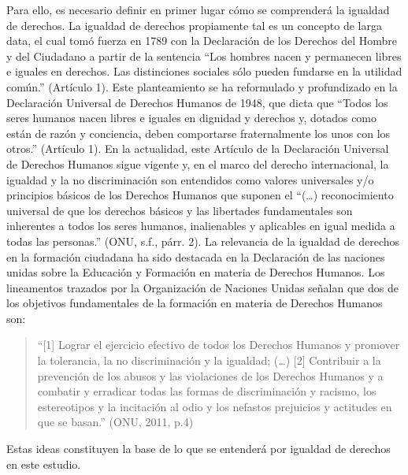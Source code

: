 \documentclass[12pt,twoside]{templates/facsothesis}
\begin{document}
Para ello, es necesario definir en primer lugar cómo se comprenderá la igualdad de derechos. La igualdad de derechos propiamente tal es un concepto de larga data, el cual tomó fuerza en 1789 con la Declaración de los Derechos del Hombre y del Ciudadano a partir de la sentencia ``Los hombres nacen y permanecen libres e iguales en derechos. Las distinciones sociales sólo pueden fundarse en la utilidad común.'' (Artículo 1). Este planteamiento se ha reformulado y profundizado en la Declaración Universal de Derechos Humanos de 1948, que dicta que ``Todos los seres humanos nacen libres e iguales en dignidad y derechos y, dotados como están de razón y conciencia, deben comportarse fraternalmente los unos con los otros.'' (Artículo 1). En la actualidad, este Artículo de la Declaración Universal de Derechos Humanos sigue vigente y, en el marco del derecho internacional, la igualdad y la no discriminación son entendidos como valores universales y/o principios básicos de los Derechos Humanos que suponen el ``(\ldots) reconocimiento universal de que los derechos básicos y las libertades fundamentales son inherentes a todos los seres humanos, inalienables y aplicables en igual medida a todas las personas.'' (ONU, s.f., párr. 2). La relevancia de la igualdad de derechos en la formación ciudadana ha sido destacada en la Declaración de las naciones unidas sobre la Educación y Formación en materia de Derechos Humanos. Los lineamentos trazados por la Organización de Naciones Unidas señalan que dos de los objetivos fundamentales de la formación en materia de Derechos Humanos son:

\begin{quote}
``{[}1{]} Lograr el ejercicio efectivo de todos los Derechos Humanos y promover la tolerancia, la no discriminación y la igualdad; (\ldots) {[}2{]} Contribuir a la prevención de los abusos y las violaciones de los Derechos Humanos y a combatir y erradicar todas las formas de discriminación y racismo, los estereotipos y la incitación al odio y los nefastos prejuicios y actitudes en que se basan.'' (ONU, 2011, p.4)
\end{quote}

Estas ideas constituyen la base de lo que se entenderá por igualdad de derechos en este estudio.
\end{document}
